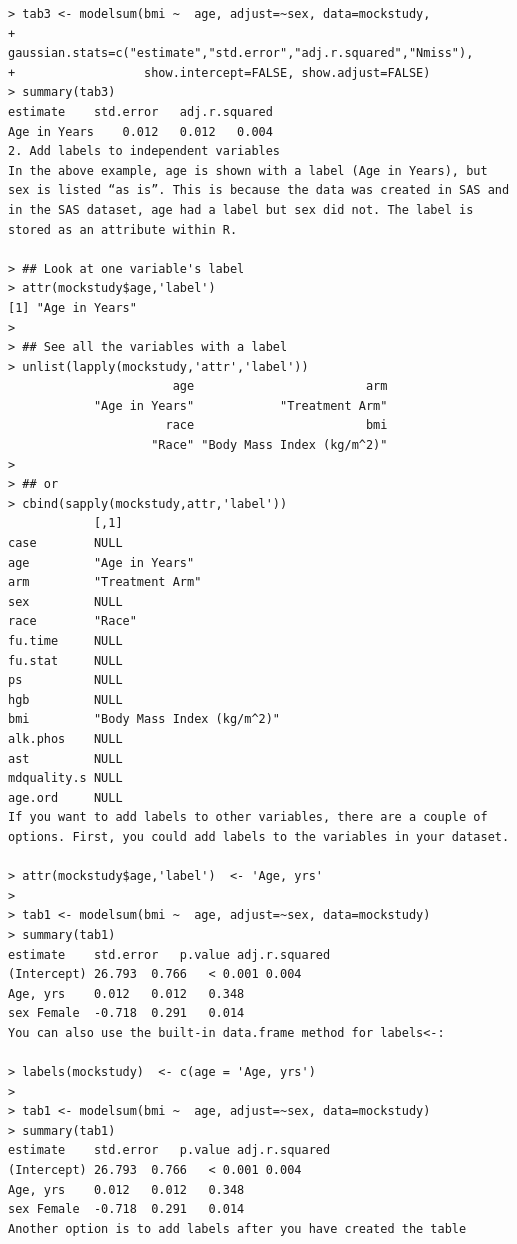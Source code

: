 \documentclass[
]{book}
\begin{document}
\begin{verbatim}
> tab3 <- modelsum(bmi ~  age, adjust=~sex, data=mockstudy,
+                  gaussian.stats=c("estimate","std.error","adj.r.squared","Nmiss"), 
+                  show.intercept=FALSE, show.adjust=FALSE)
> summary(tab3)
estimate    std.error   adj.r.squared
Age in Years    0.012   0.012   0.004
2. Add labels to independent variables
In the above example, age is shown with a label (Age in Years), but sex is listed “as is”. This is because the data was created in SAS and in the SAS dataset, age had a label but sex did not. The label is stored as an attribute within R.

> ## Look at one variable's label
> attr(mockstudy$age,'label')
[1] "Age in Years"
> 
> ## See all the variables with a label
> unlist(lapply(mockstudy,'attr','label'))
                       age                        arm 
            "Age in Years"            "Treatment Arm" 
                      race                        bmi 
                    "Race" "Body Mass Index (kg/m^2)" 
> 
> ## or
> cbind(sapply(mockstudy,attr,'label'))
            [,1]                      
case        NULL                      
age         "Age in Years"            
arm         "Treatment Arm"           
sex         NULL                      
race        "Race"                    
fu.time     NULL                      
fu.stat     NULL                      
ps          NULL                      
hgb         NULL                      
bmi         "Body Mass Index (kg/m^2)"
alk.phos    NULL                      
ast         NULL                      
mdquality.s NULL                      
age.ord     NULL                      
If you want to add labels to other variables, there are a couple of options. First, you could add labels to the variables in your dataset.

> attr(mockstudy$age,'label')  <- 'Age, yrs'
> 
> tab1 <- modelsum(bmi ~  age, adjust=~sex, data=mockstudy)
> summary(tab1)
estimate    std.error   p.value adj.r.squared
(Intercept) 26.793  0.766   < 0.001 0.004
Age, yrs    0.012   0.012   0.348   
sex Female  -0.718  0.291   0.014   
You can also use the built-in data.frame method for labels<-:

> labels(mockstudy)  <- c(age = 'Age, yrs')
> 
> tab1 <- modelsum(bmi ~  age, adjust=~sex, data=mockstudy)
> summary(tab1)
estimate    std.error   p.value adj.r.squared
(Intercept) 26.793  0.766   < 0.001 0.004
Age, yrs    0.012   0.012   0.348   
sex Female  -0.718  0.291   0.014   
Another option is to add labels after you have created the table


\end{verbatim}
\end{document}
